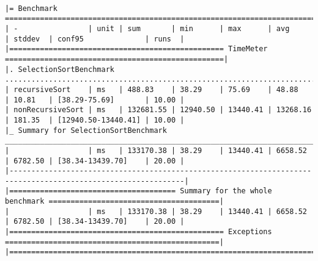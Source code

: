 \documentclass{article}
\begin{document}
\begingroup
\fontsize{8pt}{8pt}\selectfont
\begin{verbatim}

|= Benchmark ==================================================================================================|
| -                | unit | sum       | min      | max      | avg      | stddev  | conf95              | runs  |
|================================================= TimeMeter ==================================================|
|. SelectionSortBenchmark .....................................................................................|
| recursiveSort    | ms   | 488.83    | 38.29    | 75.69    | 48.88    | 10.81   | [38.29-75.69]       | 10.00 |
| nonRecursiveSort | ms   | 132681.55 | 12940.50 | 13440.41 | 13268.16 | 181.35  | [12940.50-13440.41] | 10.00 |
|_ Summary for SelectionSortBenchmark _________________________________________________________________________|
|                  | ms   | 133170.38 | 38.29    | 13440.41 | 6658.52  | 6782.50 | [38.34-13439.70]    | 20.00 |
|--------------------------------------------------------------------------------------------------------------|
|====================================== Summary for the whole benchmark =======================================|
|                  | ms   | 133170.38 | 38.29    | 13440.41 | 6658.52  | 6782.50 | [38.34-13439.70]    | 20.00 |
|================================================= Exceptions =================================================|
|==============================================================================================================|

\end{verbatim}
\endgroup
\end{document}
